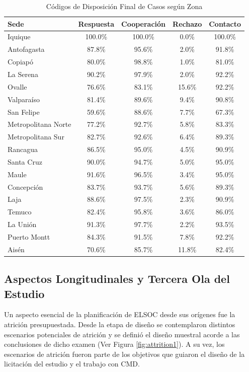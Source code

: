 \documentclass[12pt]{report}
\begin{document}
\begin{table}[H]
	\centering
	\caption{Códigos de Disposición Final de Casos según Zona}
	\label{tab:cdf}
	\begin{tabular}{l c c c c}
		\toprule
		\textbf{Sede} & \textbf{Respuesta} &\textbf{Cooperación}&\textbf{Rechazo} &\textbf{Contacto}\\
\midrule
Iquique & 100.0\% & 100.0\% & 0.0\% & 100.0\%\\
Antofagasta & 87.8\% & 95.6\% & 2.0\% & 91.8\%\\
Copiapó & 80.0\% & 98.8\% & 1.0\% & 81.0\%\\
La Serena & 90.2\% & 97.9\% & 2.0\% & 92.2\%\\
Ovalle & 76.6\% & 83.1\% & 15.6\% & 92.2\%\\
Valparaíso  & 81.4\% & 89.6\% & 9.4\% & 90.8\%\\
San Felipe & 59.6\% & 88.6\% & 7.7\% & 67.3\%\\
Metropolitana Norte & 77.2\% & 92.7\% & 5.8\% & 83.3\%\\
Metropolitana Sur & 82.7\% & 92.6\% & 6.4\% & 89.3\%\\
Rancagua & 86.5\% & 95.0\% & 4.5\% & 90.9\%\\
Santa Cruz & 90.0\% & 94.7\% & 5.0\% & 95.0\%\\
Maule & 91.6\% & 96.5\% & 3.4\% & 95.0\%\\
Concepción & 83.7\% & 93.7\% & 5.6\% & 89.3\%\\
Laja & 88.6\% & 97.5\% & 2.3\% & 90.9\%\\
Temuco & 82.4\% & 95.8\% & 3.6\% & 86.0\%\\
La Unión & 91.3\% & 97.7\% & 2.2\% & 93.5\%\\
Puerto Montt & 84.3\% & 91.5\% & 7.8\% & 92.2\%\\
Aisén & 70.6\% & 85.7\% & 11.8\% & 82.4\%\\
		\bottomrule
	\end{tabular}
\end{table}







\subsection*{Aspectos Longitudinales y Tercera Ola del Estudio}

Un aspecto esencial de la planificación de ELSOC desde sus orígenes fue la atrición presupuestada. Desde la etapa de diseño se contemplaron distintos escenarios potenciales de atrición y se definió el diseño muestral acorde a las conclusiones de dicho examen (Ver Figura \ref{fig:attrition1}). A su vez, los escenarios de atrición fueron parte de los objetivos que guiaron el diseño de la licitación del estudio y el trabajo con CMD.\\
\end{document}
